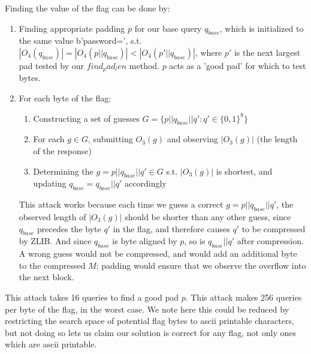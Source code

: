 \documentclass[]{article}
\begin{document}
Finding the value of the flag can be done by:
\begin{enumerate}
	\item Finding appropriate padding $p$ for our base query $q_{base}$, which is initialized to the same value b'password=', s.t. $|O_4(q_{base})| = |O_4(p||q_{base})| <   |O_4(p'||q_{base})|$, where $p'$ is the next largest pad tested by our $find_pad_len$ method. $p$ acts as a 'good pad' for which to test bytes.
	\item For each byte of the flag:
	\begin{enumerate}
		\item Constructing a set of guesses $G = \{p || q_{base} || q': q' \in \{0,1\}^8\}$
		\item For each $g \in G$, submitting $O_3(g)$ and observing $|O_3(g)|$ (the length of the response)
		\item Determining the $g =  p || q_{base} || q' \in G$ s.t. $|O_3(g)|$ is shortest, and updating $q_{base} = q_{base} || q'$ accordingly
	\end{enumerate}
	This attack works because each time we guess a correct $g = p || q_{base} || q'$, the observed length of $|O_3(g)|$ should be shorter than any other guess, since $q_{base}$ precedes the byte $q'$ in the flag, and therefore causes $q'$ to be compressed by ZLIB. And since $q_{base}$ is byte aligned by $p$, so is $ q_{base} || q'$ after compression. A wrong guess would not be compressed, and would add an additional byte to the compressed $M$; padding would ensure that we observe the overflow into the next block.
\end{enumerate}

This attack takes 16 queries to find a good pad $p$. This attack makes 256 queries per byte of the flag, in the worst case. We note here this could be reduced by restricting the search space of potential flag bytes to ascii printable characters, but not doing so lets us claim our solution is correct for any flag, not only ones which are ascii printable.
\end{document}
